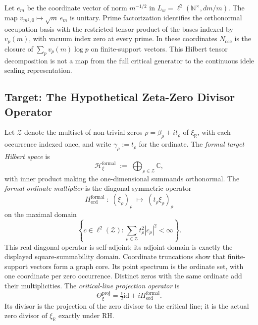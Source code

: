 \begin{remark}
\label{v4-arith:w9-r4:rem:bc-structure}
Let \(e_m\) be the coordinate vector of norm \(m^{-1/2}\) in
\(L_w=\ell^2(\mathbb N^\times,dm/m)\).
The map \(v_{m^2,0}\mapsto\sqrt m\,e_m\) is unitary.
Prime factorization identifies the orthonormal occupation basis
with the restricted tensor product of the bases indexed by
\(v_p(m)\), with vacuum index zero at every prime.
In these coordinates \(N_{\mathrm{occ}}\) is the closure of
\(\sum_p v_p(m)\log p\) on finite-support vectors.
This Hilbert tensor decomposition is not a map from the full
critical generator to the continuous idele scaling representation.
\end{remark}

\subsection{Target: The Hypothetical Zeta-Zero Divisor Operator}
\label{v4-arith:w9-r4:setup:target}

\begin{definition}
\label{v4-arith:w9-r4:def:target-data}
\ClaimStatusDefinitional Let \(\mathcal{Z}\) denote the multiset of
non-trivial zeros \(\rho=\beta_{\rho}+it_{\rho}\) of
\(\xi_{\mathbb{R}}\), with each occurrence indexed once, and write
\(\gamma_{\rho}:=t_{\rho}\) for the ordinate. The
\emph{formal target Hilbert space} is
\[
\mathcal{H}_{\xi}^{\mathrm{formal}}\;:=\;\bigoplus_{\rho\in\mathcal{Z}}\mathbb{C},
\]
with inner product making the one-dimensional summands
orthonormal. The \emph{formal ordinate multiplier} is the
diagonal symmetric operator
\[
H_{\mathrm{ord}}^{\mathrm{formal}}\;:\;(\xi_{\rho})_{\rho}\;\mapsto\;(t_{\rho}\xi_{\rho})_{\rho}
\]
on the maximal domain
\[
 \left\{c\in\ell^2(\mathcal Z):
             \sum_{\rho\in\mathcal Z}t_\rho^2|c_\rho|^2<\infty\right\}.
\]
This real diagonal operator is self-adjoint; its adjoint domain is
exactly the displayed square-summability domain. Coordinate
truncations show that finite-support vectors form a graph core.
Its point spectrum is the ordinate set, with one coordinate per
zero occurrence. Distinct zeros with the same ordinate add their
multiplicities. The \emph{critical-line
projection operator} is
\[
\Theta_{\xi}^{\mathrm{proj}}=\tfrac12\mathrm{id}+iH_{\mathrm{ord}}^{\mathrm{formal}}.
\]
Its divisor is the projection of the zero divisor to the critical
line; it is the actual zero divisor of \(\xi_{\mathbb R}\) exactly
under RH.
\end{definition}

